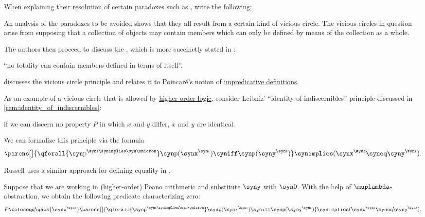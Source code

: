 \begin{remark}\label{rem:vicious_circle_principle}
  When explaining their resolution of certain paradoxes such as , \textcite[83]{WhiteheadRussell1927PrincipiaMathematicaVol1} write the following:
  \begin{displayquote}
    An analysis of the paradoxes to be avoided shows that they all result from a certain kind of vicious circle. The vicious circles in question arise from supposing that a collection of objects may contain members which can only be defined by means of the collection as a whole.
  \end{displayquote}

  The authors then proceed to discuss the , which is more succinctly stated in \cite[237]{Russell1908TypeTheory}:
  \begin{displayquote}
    \enquote{no totality can contain members defined in terms of itself}.
  \end{displayquote}

  \Textcite[347]{Church1956LogicVol1} discusses the vicious circle principle and relates it to Poincar\'{e}'s notion of \hyperref[con:impredicative_definition]{impredicative definitions}.

  As an example of a vicious circle that is allowed by \hyperref[def:higher_order_logic]{higher-order logic}, consider Leibniz' \enquote{identity of indiscernibles} principle discussed in \cref{rem:identity_of_indiscernibles}:
  \begin{displayquote}
    \textellipsis if we can discern no property \( P \) in which \( x \) and \( y \) differ, \( x \) and \( y \) are identical.
  \end{displayquote}

  We can formalize this principle via the formula
  \begin{equation*}
    \parens[\big]{ \qforall {\synp^{\syn\iota \synimplies \syn\omicron}} \synp(\synx^{\syn\iota}) \syniff \synp(\syny^{\syn\iota}) } \synimplies (\synx^{\syn\iota} \syneq \syny^{\syn\iota}).
  \end{equation*}

  Russell uses a similar approach for defining equality in \cite[246]{Russell1908TypeTheory}.

  Suppose that we are working in (higher-order) \hyperref[def:peano_arithmetic]{Peano arithmetic} and substitute \( \syny \) with \( \syn0 \). With the help of \( \muplambda \)-abstraction, we obtain the following predicate characterizing zero:
  \begin{equation*}
    P \coloneqq \qabs {\synx^{\syn\iota}} \parens[\big]{ \qforall {\synp^{\syn\iota \synimplies \syn\omicron}} \synp(\synx^{\syn\iota}) \syniff \synp(\syny^{\syn\iota}) } \synimplies (\synx^{\syn\iota} \syneq \syny^{\syn\iota}).
  \end{equation*}


\end{remark}
